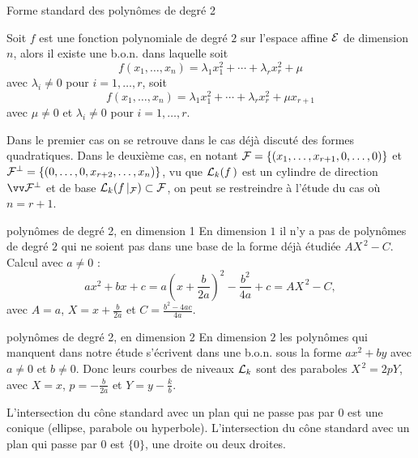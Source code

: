 \documentclass[11pt]{m53beamer}
\begin{document}
\begin{frame}{Forme standard des polynômes de degré 2}
  \begin{proposition}
    Soit $f$ est une fonction polynomiale de degré $2$ sur l'espace affine $\mathcal{E}$ de dimension $n$, alors il existe une b.o.n. dans laquelle soit
    \[
      f(x_{1},\ldots,x_{n}) = \lambda_{1}x_{1}^{2}+\cdots+\lambda_{r}x_{r}^{2}+\mu
    \]
    avec $\lambda_{i}\neq 0$ pour $i=1,\ldots,r$\pause, soit
    \[
      f(x_{1},\ldots,x_{n}) = \lambda_{1}x_{1}^{2}+\cdots+\lambda_{r}x_{r}^{2}+\mu x_{r+1}
    \]
     avec $\mu\neq0$ et $\lambda_{i}\neq 0$ pour $i=1,\ldots,r$.
  \end{proposition}\pause
  Dans le premier cas on se retrouve dans le cas déjà discuté des formes quadratiques.\pause\newline
  Dans le deuxième cas, en notant $\mathcal{F}=\{(x_{1},\ldots,x_{r+1},0,\ldots,0)\}$ et $\mathcal{F}^{\perp}=\{(0,\ldots,0,x_{r+2},\ldots,x_{n})\}$, vu que $\mathcal{L}_{k}(f\,)$ est un cylindre de direction $\ev{F^{\perp}}$ et de base $\mathcal{L}_{k}(f\,|_{\mathcal{F}}) \subset \mathcal{F}$, on peut se restreindre à l'étude du cas où $n=r+1$.
\end{frame}

\begin{frame}{polynômes de degré 2, en dimension 1}
  En dimension $1$ il n'y a pas de polynômes de degré $2$ qui ne soient pas dans une base de la forme déjà étudiée $AX^{\,2}-C$.\pause\newline
  Calcul avec $a\neq0$ :
  \[
    ax^{2}+bx+c=a(x+\frac{b}{2a})^{2}-\frac{b^{2}}{4a}+c=AX^{\,2}-C,
  \]
  avec $A=a$, $X=x+\frac{b}{2a}$ et $C=\frac{b^{2}-4ac}{4a}$.
\end{frame}

\begin{frame}{polynômes de degré 2, en dimension 2}
  En dimension $2$ les polynômes qui manquent dans notre étude s'écrivent dans une b.o.n. sous la forme $ax^{2}+by$ avec $a\neq0$ et $b\neq0$.\pause\newline
  Donc leurs courbes de niveaux $\mathcal{L}_{k}$ sont des paraboles $X^{\,2}=2pY$, avec $X=x$, $p=-\frac{b}{2a}$ et $Y=y-\frac{k}{b}$.\pause
  \begin{proposition}
    L'intersection du cône standard avec un plan qui ne passe pas par $0$ est une conique (ellipse, parabole ou hyperbole).\pause\newline
    L'intersection du cône standard avec un plan qui passe par $0$ est $\{0\}$, une droite ou deux droites.
  \end{proposition}
\end{frame}
\end{document}
